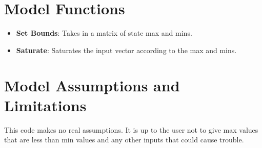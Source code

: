 \section{Model Functions}

\begin{itemize}
	\item \textbf{Set Bounds}: Takes in a matrix of state max and mins.
	\item \textbf{Saturate}:  Saturates the input vector according to the max and mins.
\end{itemize}


\section{Model Assumptions and Limitations}
This code makes no real assumptions. It is up to the user not to give max values that are less than min values and any other inputs that could cause trouble.
